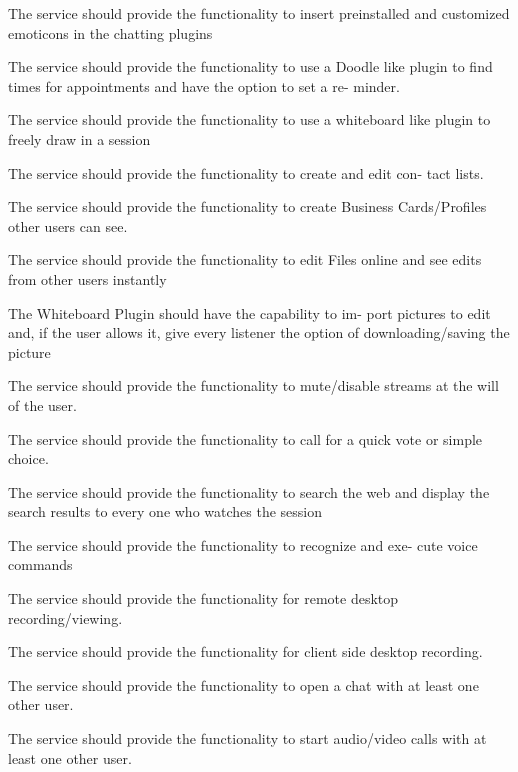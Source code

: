 \documentclass[8pt]{beamer}
\begin{document}
\begin{frame}
The service should provide the functionality to insert preinstalled
and customized emoticons in the chatting plugins
\end{frame}
\begin{frame}
 The service should provide the functionality to use a Doodle like
plugin to find times for appointments and have the option to set a re-
minder.
\end{frame}
\begin{frame}
 The service should provide the functionality to use a whiteboard like
plugin to freely draw in a session
\end{frame}
\begin{frame}
 The service should provide the functionality to create and edit con-
tact lists.
\end{frame}
\begin{frame}
 The service should provide the functionality to create Business
Cards/Profiles other users can see.
\end{frame}
\begin{frame}
 The service should provide the functionality to edit Files online and
see edits from other users instantly
\end{frame}
\begin{frame}
 The Whiteboard Plugin should have the capability to im-
port pictures to edit and, if the user allows it, give every listener the option
of downloading/saving the picture
\end{frame}
\begin{frame}
 The service should provide the functionality to mute/disable streams
at the will of the user.
\end{frame}
\begin{frame}
 The service should provide the functionality to call for a quick vote
or simple choice.
\end{frame}
\begin{frame}
 The service should provide the functionality to search the web and
display the search results to every one who watches the session
\end{frame}
\begin{frame}
 The service should provide the functionality to recognize and exe-
cute voice commands
\end{frame}
\begin{frame}
 The service should provide the functionality for remote desktop
recording/viewing.
\end{frame}
\begin{frame}
 The service should provide the functionality for client side desktop
recording.
\end{frame}
\begin{frame}
 The service should provide the functionality to open a chat with at
least one other user.
\end{frame}
\begin{frame}
 The service should provide the functionality to start audio/video
calls with at least one other user.
\end{frame}
\end{document}

